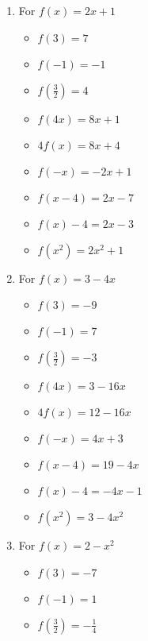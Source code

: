 \documentclass{ximera}
\begin{document}
\begin{enumerate}

\item For $f(x) = 2x+1$ 


\begin{itemize}
\item $f(3) = 7$
\item $f(-1) = -1$
\item $f\left(\frac{3}{2} \right) = 4$
\end{itemize}


\begin{itemize}
\item  $f(4x) = 8x+1$
\item $4f(x) = 8x+4$
\item $f(-x) = -2x+1$
\end{itemize}


\begin{itemize}
\item  $f(x-4) = 2x-7$
\item $f(x) - 4 = 2x-3$
\item  $f\left(x^2\right) = 2x^2+1$
\end{itemize}


\item For $f(x) = 3-4x$ 


\begin{itemize}
\item $f(3) = -9$
\item $f(-1) = 7$
\item $f\left(\frac{3}{2} \right) = -3$
\end{itemize}


\begin{itemize}
\item  $f(4x) = 3-16x$
\item $4f(x) = 12-16x$
\item $f(-x) = 4x+3$
\end{itemize}


\begin{itemize}
\item  $f(x-4) = 19-4x$
\item $f(x) - 4 = -4x-1$
\item  $f\left(x^2\right) = 3-4x^2$
\end{itemize}




\item For $f(x) = 2 - x^2$ 


\begin{itemize}
\item $f(3) = -7$
\item $f(-1) = 1$
\item $f\left(\frac{3}{2} \right) = -\frac{1}{4}$
\end{itemize}



\end{enumerate}
\end{document}
